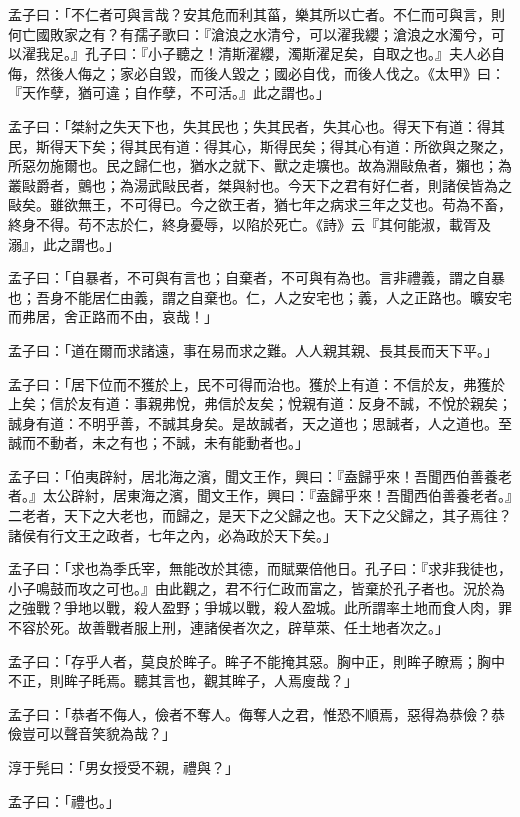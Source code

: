 \documentclass[12pt,a4paper]{ctexbook}
\begin{document}
孟子曰：「不仁者可與言哉？安其危而利其菑，樂其所以亡者。不仁而可與言，則何亡國敗家之有？有孺子歌曰：『滄浪之水清兮，可以濯我纓；滄浪之水濁兮，可以濯我足。』孔子曰：『小子聽之！清斯濯纓，濁斯濯足矣，自取之也。』夫人必自侮，然後人侮之；家必自毀，而後人毀之；國必自伐，而後人伐之。《太甲》曰：『天作孽，猶可違；自作孽，不可活。』此之謂也。」\par
孟子曰：「桀紂之失天下也，失其民也；失其民者，失其心也。得天下有道：得其民，斯得天下矣；得其民有道：得其心，斯得民矣；得其心有道：所欲與之聚之，所惡勿施爾也。民之歸仁也，猶水之就下、獸之走壙也。故為淵敺魚者，獺也；為叢敺爵者，鸇也；為湯武敺民者，桀與紂也。今天下之君有好仁者，則諸侯皆為之敺矣。雖欲無王，不可得已。今之欲王者，猶七年之病求三年之艾也。苟為不畜，終身不得。苟不志於仁，終身憂辱，以陷於死亡。《詩》云『其何能淑，載胥及溺』，此之謂也。」\par
孟子曰：「自暴者，不可與有言也；自棄者，不可與有為也。言非禮義，謂之自暴也；吾身不能居仁由義，謂之自棄也。仁，人之安宅也；義，人之正路也。曠安宅而弗居，舍正路而不由，哀哉！」\par
孟子曰：「道在爾而求諸遠，事在易而求之難。人人親其親、長其長而天下平。」\par
孟子曰：「居下位而不獲於上，民不可得而治也。獲於上有道：不信於友，弗獲於上矣；信於友有道：事親弗悅，弗信於友矣；悅親有道：反身不誠，不悅於親矣；誠身有道：不明乎善，不誠其身矣。是故誠者，天之道也；思誠者，人之道也。至誠而不動者，未之有也；不誠，未有能動者也。」\par
孟子曰：「伯夷辟紂，居北海之濱，聞文王作，興曰：『盍歸乎來！吾聞西伯善養老者。』太公辟紂，居東海之濱，聞文王作，興曰：『盍歸乎來！吾聞西伯善養老者。』二老者，天下之大老也，而歸之，是天下之父歸之也。天下之父歸之，其子焉往？諸侯有行文王之政者，七年之內，必為政於天下矣。」\par
孟子曰：「求也為季氏宰，無能改於其德，而賦粟倍他日。孔子曰：『求非我徒也，小子鳴鼓而攻之可也。』由此觀之，君不行仁政而富之，皆棄於孔子者也。況於為之強戰？爭地以戰，殺人盈野；爭城以戰，殺人盈城。此所謂率土地而食人肉，罪不容於死。故善戰者服上刑，連諸侯者次之，辟草萊、任土地者次之。」\par
孟子曰：「存乎人者，莫良於眸子。眸子不能掩其惡。胸中正，則眸子瞭焉；胸中不正，則眸子眊焉。聽其言也，觀其眸子，人焉廋哉？」\par
孟子曰：「恭者不侮人，儉者不奪人。侮奪人之君，惟恐不順焉，惡得為恭儉？恭儉豈可以聲音笑貌為哉？」\par
淳于髡曰：「男女授受不親，禮與？」\par
孟子曰：「禮也。」\par
\end{document}

